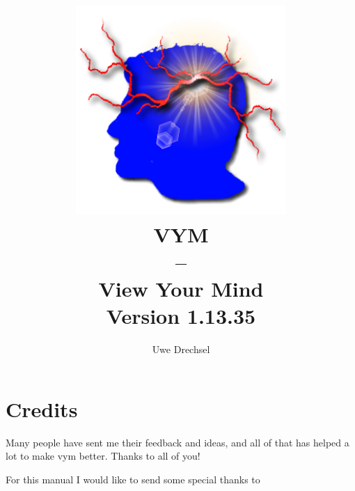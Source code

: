\documentclass[12pt,a4paper]{article}
\newcommand{\vym}{{\sc vym }}
\begin{document}
\title{
    \includegraphics[width=8cm]{images/vym-logo-new.png}
    \\
VYM \\ -- \\View Your Mind\\ {\small Version 1.13.35}}
\author{\textcopyright Uwe Drechsel  }


\maketitle

\newpage

\tableofcontents

\newpage

\section*{Credits}
Many people have sent me their feedback and ideas, and all of that has
helped a lot to make \vym better. Thanks to all of you!

For this manual I would like to send some special thanks to
\end{document}
